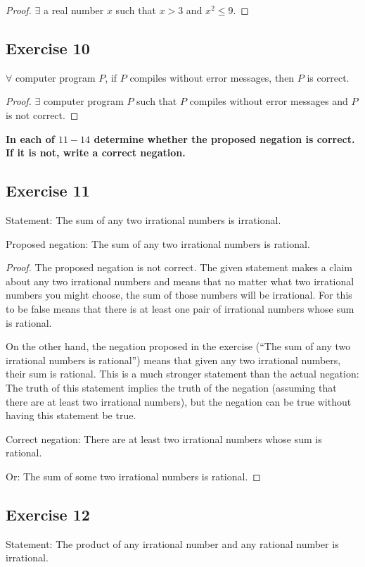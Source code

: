 \documentclass[14pt]{extarticle}
\newcommand{\fa}{\forall}
\newcommand{\te}{\exists}
\begin{document}
\begin{proof}
    $\te$ a real number $x$ such that $x > 3$ and $x^2 \leq 9$.
\end{proof}

\subsection{Exercise 10}
$\fa$ computer program $P$, if $P$ compiles without error messages, then $P$ is correct.

\begin{proof}
    $\te$ computer program $P$ such that $P$ compiles without error messages and $P$ is not correct.
\end{proof}

{\bf \color{cyan} In each of $11-14$ determine whether the proposed negation is correct. If it is not, write a correct negation.}

\subsection{Exercise 11}
Statement: The sum of any two irrational numbers is irrational.

Proposed negation: The sum of any two irrational numbers is rational.

\begin{proof}
    The proposed negation is not correct. The given statement makes a claim about any two irrational numbers and means that no matter what two irrational numbers you might choose, the sum of those numbers will be irrational. For this to be false means that there is at least one pair of irrational numbers whose sum is rational.

    On the other hand, the negation proposed in the exercise (“The sum of any two irrational numbers is rational”) means that given any two irrational numbers, their sum is rational. This is a much stronger statement than the actual negation: The truth of this statement implies the truth of the negation (assuming that there are at least two irrational numbers), but the negation can be true without having this statement be true.

    Correct negation: There are at least two irrational numbers whose sum is rational.

    Or: The sum of some two irrational numbers is rational.
\end{proof}

\subsection{Exercise 12}
Statement: The product of any irrational number and any rational number is irrational.
\end{document}

